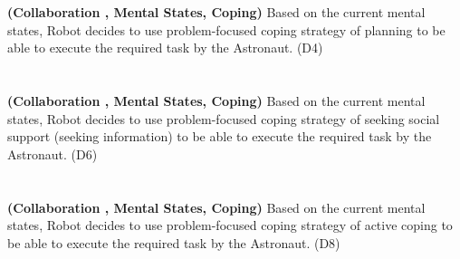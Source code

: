 \noindent{}\\

\noindent{}\\

\noindent\textbf{(Collaboration , Mental States, Coping)} Based on the current
mental states, Robot decides to use problem-focused coping strategy of planning
to be able to execute the required task by the Astronaut. (D4)\\

\noindent{}\\

\noindent{}\\
  
\noindent\textbf{(Collaboration , Mental States, Coping)} Based on the current
mental states, Robot decides to use problem-focused coping strategy of seeking
social support (seeking information) to be able to execute the required task by
the Astronaut. (D6)\\

\noindent{}\\
  
\noindent{}\\
  
\noindent\textbf{(Collaboration , Mental States, Coping)} Based on the current
mental states, Robot decides to use problem-focused coping strategy of active
coping to be able to execute the required task by the Astronaut. (D8)\\

